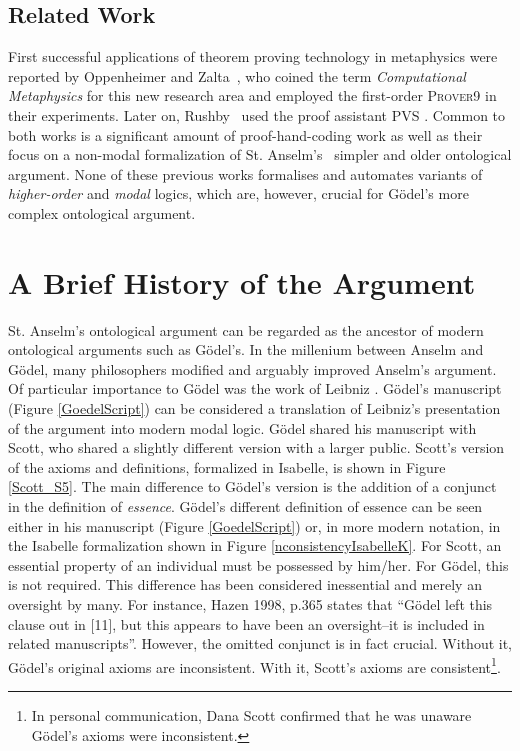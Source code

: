 \documentclass{article}
\begin{document}
\subsection{Related Work}

First successful applications of theorem proving technology in
metaphysics were reported by Oppenheimer and
Zalta~, who coined the term \textit{Computational Metaphysics} for this new research area and employed the first-order
\textsc{Prover9} \cite{prover9-mace4} in their experiments. Later on, Rushby~ used the proof assistant \textsc{PVS} \cite{cade92-pvs}. Common to both
works is a significant amount of proof-hand-coding work as well as their
focus on a non-modal formalization of St. Anselm's~ simpler 
and older ontological argument. 
None of these previous works formalises and automates variants of \emph{higher-order} and \emph{modal} logics, which are, however, crucial
for G\"{o}del's more complex ontological argument.


\section{A Brief History of the Argument}

St. Anselm's ontological argument \cite{Proslogion} can be regarded as the ancestor of modern ontological arguments such as G\"odel's. In the millenium between Anselm and G\"odel, many philosophers modified and arguably improved Anselm's argument. Of particular importance to G\"odel was the work of Leibniz \cite{ToDo}. 
G\"odel's manuscript (Figure \ref{GoedelScript}) can be considered a translation of Leibniz's presentation of the argument into modern modal logic. G\"odel shared his manuscript with Scott, who shared a slightly different version with a larger public. Scott's version of the axioms and definitions, formalized in Isabelle, is shown in Figure \ref{Scott_S5}. The main difference to G\"odel's version is the addition of a conjunct in the definition of \emph{essence}. G\"odel's different definition of essence can be seen either in his manuscript (Figure \ref{GoedelScript}) or, in more modern notation, in the Isabelle formalization shown in Figure \ref{nconsistencyIsabelleK}. For Scott, an essential property of an individual must be possessed by him/her. For G\"odel, this is not required. This difference has been considered inessential and merely an oversight by many. For instance, Hazen 1998, p.365 \cite[p.365]{Hazen1998} states that ``G\"odel left this clause out in [11], but this appears to have been an oversight--it is included in related manuscripts''. However, the omitted conjunct is in fact crucial. Without it, G\"odel's original axioms are inconsistent. With it, Scott's axioms are consistent\footnote{In personal communication, Dana Scott confirmed that he was unaware G\"odel's axioms were inconsistent.}.
\end{document}
